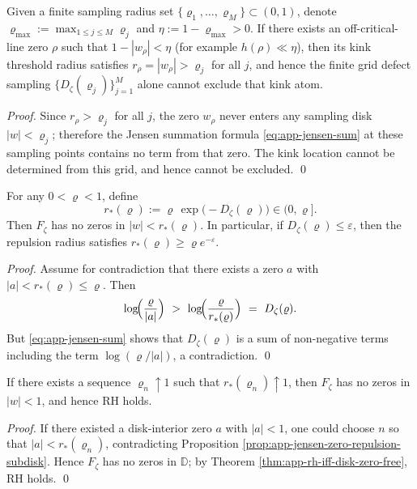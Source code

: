 \begin{corollary}\label{cor:app-jensen-kink-undetectable-threshold}
Given a finite sampling radius set \(\{\varrho_1,\dots,\varrho_M\}\subset(0,1)\), denote
\(
\varrho_{\max}:=\max_{1\le j\le M}\varrho_j
\)
and \(\eta:=1-\varrho_{\max}>0\).
If there exists an off-critical-line zero \(\rho\) such that \(1-|w_{\rho}|<\eta\) (for example \(h(\rho)\ll \eta\)), then its kink threshold radius satisfies \(r_{\rho}=|w_{\rho}|>\varrho_j\) for all \(j\), and hence the finite grid defect sampling \(\{D_{\zeta}(\varrho_j)\}_{j=1}^{M}\) alone cannot exclude that kink atom.
\end{corollary}
\begin{proof}
Since \(r_{\rho}>\varrho_j\) for all \(j\), the zero \(w_{\rho}\) never enters any sampling disk \(|w|<\varrho_j\); therefore the Jensen summation formula \eqref{eq:app-jensen-sum} at these sampling points contains no term from that zero. The kink location cannot be determined from this grid, and hence cannot be excluded. \qed
\end{proof}

\begin{proposition}\label{prop:app-jensen-zero-repulsion-subdisk}
For any \(0<\varrho<1\), define
\[
r_{\ast}(\varrho):=\varrho\,\exp\!\bigl(-D_{\zeta}(\varrho)\bigr)\in(0,\varrho].
\]
Then \(F_{\zeta}\) has no zeros in \(|w|<r_{\ast}(\varrho)\).
In particular, if \(D_{\zeta}(\varrho)\le \varepsilon\), then the repulsion radius satisfies \(r_{\ast}(\varrho)\ge \varrho e^{-\varepsilon}\).
\end{proposition}
\begin{proof}
Assume for contradiction that there exists a zero \(a\) with \(|a|<r_{\ast}(\varrho)\le \varrho\).
Then
\[
\log\!\Bigl(\frac{\varrho}{|a|}\Bigr)\ >\ \log\!\Bigl(\frac{\varrho}{r_{\ast}(\varrho)}\Bigr)\ =\ D_{\zeta}(\varrho).
\]
But \eqref{eq:app-jensen-sum} shows that \(D_{\zeta}(\varrho)\) is a sum of non-negative terms including the term \(\log(\varrho/|a|)\), a contradiction. \qed
\end{proof}

\begin{corollary}\label{cor:app-jensen-repulsion-radius-to-one}
If there exists a sequence \(\varrho_n\uparrow 1\) such that \(r_{\ast}(\varrho_n)\uparrow 1\), then \(F_{\zeta}\) has no zeros in \(|w|<1\), and hence RH holds.
\end{corollary}
\begin{proof}
If there existed a disk-interior zero \(a\) with \(|a|<1\), one could choose \(n\) so that \(|a|<r_{\ast}(\varrho_n)\), contradicting Proposition \ref{prop:app-jensen-zero-repulsion-subdisk}.
Hence \(F_{\zeta}\) has no zeros in \(\mathbb{D}\); by Theorem \ref{thm:app-rh-iff-disk-zero-free}, RH holds. \qed
\end{proof}

